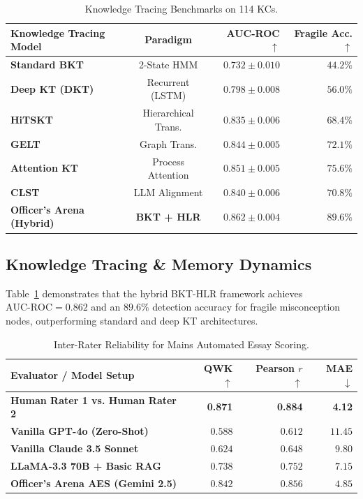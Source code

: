 \documentclass[conference]{IEEEtran}
\begin{document}
\begin{table}[h]
\centering
\caption{Knowledge Tracing Benchmarks on 114 KCs.}
\label{tab:kt_benchmarks}
\small
\begin{tabularx}{\columnwidth}{lcrr}
\toprule
\textbf{Knowledge Tracing Model} & \textbf{Paradigm} & \textbf{AUC-ROC $\uparrow$} & \textbf{Fragile Acc. $\uparrow$} \\
\midrule
\textbf{Standard BKT} \cite{CorbettAnderson1995} & 2-State HMM & $0.732 \pm 0.010$ & $44.2\%$ \\
\textbf{Deep KT (DKT)} & Recurrent (LSTM) & $0.798 \pm 0.008$ & $56.0\%$ \\
\textbf{HiTSKT} \cite{Ke2024} & Hierarchical Trans. & $0.835 \pm 0.006$ & $68.4\%$ \\
\textbf{GELT} \cite{Liang2024} & Graph Trans. & $0.844 \pm 0.005$ & $72.1\%$ \\
\textbf{Attention KT} \cite{Lu2024} & Process Attention & $0.851 \pm 0.005$ & $75.6\%$ \\
\textbf{CLST} \cite{Jung2025} & LLM Alignment & $0.840 \pm 0.006$ & $70.8\%$ \\
\textbf{Officer's Arena (Hybrid)} & \textbf{BKT + HLR} & $\mathbf{0.862 \pm 0.004}$ & $\mathbf{89.6\%}$ \\
\bottomrule
\end{tabularx}
\end{table}

\subsection{Knowledge Tracing \& Memory Dynamics}
Table~\ref{tab:kt_benchmarks} demonstrates that the hybrid BKT-HLR framework achieves $\text{AUC-ROC} = 0.862$ and an $89.6\%$ detection accuracy for fragile misconception nodes, outperforming standard and deep KT architectures.

\begin{table}[h]
\centering
\caption{Inter-Rater Reliability for Mains Automated Essay Scoring.}
\label{tab:aes_agreement}
\small
\begin{tabularx}{\columnwidth}{lrrr}
\toprule
\textbf{Evaluator / Model Setup} & \textbf{QWK $\uparrow$} & \textbf{Pearson $r$ $\uparrow$} & \textbf{MAE $\downarrow$} \\
\midrule
\textbf{Human Rater 1 vs. Human Rater 2} & \textbf{0.871} & \textbf{0.884} & \textbf{4.12} \\
\textbf{Vanilla GPT-4o (Zero-Shot)} & $0.588$ & $0.612$ & $11.45$ \\
\textbf{Vanilla Claude 3.5 Sonnet} & $0.624$ & $0.648$ & $9.80$ \\
\textbf{LLaMA-3.3 70B + Basic RAG} & $0.738$ & $0.752$ & $7.15$ \\
\textbf{Officer's Arena AES (Gemini 2.5)} & $\mathbf{0.842}$ & $\mathbf{0.856}$ & $\mathbf{4.85}$ \\
\bottomrule
\end{tabularx}
\end{table}
\end{document}

